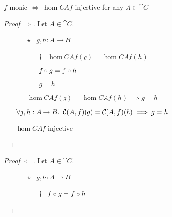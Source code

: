 \begin{prop}
  $f$ monic $\iff$ $\hom{C}{A}{f}$ injective for any $A\in\cat{C}$

  \begin{proof}[Proof $\Rightarrow$]
    Let $A\in\cat{C}$.
    \begin{itemize}
      \item[\phs]
        \begin{itemize}
          \item[$\star$] \Let~$g, h : A\to B$
            \marginnote{\Hyp}

          \item[\phs]
            \begin{itemize}
            \item[$\dagger$]
              \Ass~$\hom{C}{A}{f}(g) = \hom{C}{A}{f}(h)$
              \marginnote{\Hyp}

            \item[\iffs] $f\compose g = f\compose h$
              \marginnote{\Def-\ref{def:co-hom}}

            \item[\imps] $g = h$
            \end{itemize}

          \item[\imps] $\hom{C}{A}{f}(g) = \hom{C}{A}{f}(h) \implies g = h$
            \marginnote{\imps-\Intro-$\dagger$}
        \end{itemize}
      \item[\imps] $\forall g, h : A \to B\ldotp~\hom{C}{A}{f}(g) = \hom{C}{A}{f}(h) \implies g = h$
        \marginnote{$\forall$-\Intro-$\star$}

      \item[\iffs] $\hom{C}{A}{f}$ injective
        \qedhere
    \end{itemize}
  \end{proof}

  \begin{proof}[Proof $\Leftarrow$]
    Let $A\in\cat{C}$.
    \begin{itemize}
      \item[\phs]
        \begin{itemize}
          \item[$\star$] \Let~$g, h : A\to B$
            \marginnote{\Hyp}

          \item[\phs]
            \begin{itemize}
            \item[$\dagger$]
              \Ass~$f\compose g = f\compose h$
              \marginnote{\Hyp}


\end{itemize}
\end{itemize}
\end{itemize}
\end{proof}
\end{prop}
